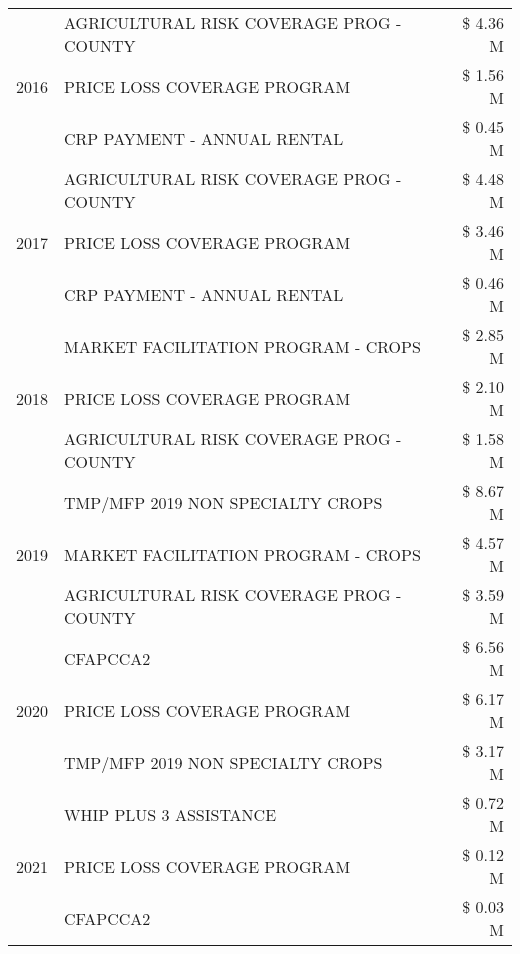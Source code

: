 \begin{tabular}{llr}
\cline{1-3}
\multirow[t]{3}{*}{2016} & AGRICULTURAL RISK COVERAGE PROG - COUNTY & \$ 4.36 M \\
 & PRICE LOSS COVERAGE PROGRAM & \$ 1.56 M \\
 & CRP PAYMENT - ANNUAL RENTAL & \$ 0.45 M \\
\cline{1-3}
\multirow[t]{3}{*}{2017} & AGRICULTURAL RISK COVERAGE PROG - COUNTY & \$ 4.48 M \\
 & PRICE LOSS COVERAGE PROGRAM & \$ 3.46 M \\
 & CRP PAYMENT - ANNUAL RENTAL & \$ 0.46 M \\
\cline{1-3}
\multirow[t]{3}{*}{2018} & MARKET FACILITATION PROGRAM - CROPS & \$ 2.85 M \\
 & PRICE LOSS COVERAGE PROGRAM & \$ 2.10 M \\
 & AGRICULTURAL RISK COVERAGE PROG - COUNTY & \$ 1.58 M \\
\cline{1-3}
\multirow[t]{3}{*}{2019} & TMP/MFP 2019 NON SPECIALTY CROPS & \$ 8.67 M \\
 & MARKET FACILITATION PROGRAM - CROPS & \$ 4.57 M \\
 & AGRICULTURAL RISK COVERAGE PROG - COUNTY & \$ 3.59 M \\
\cline{1-3}
\multirow[t]{3}{*}{2020} & CFAPCCA2 & \$ 6.56 M \\
 & PRICE LOSS COVERAGE PROGRAM & \$ 6.17 M \\
 & TMP/MFP 2019 NON SPECIALTY CROPS & \$ 3.17 M \\
\cline{1-3}
\multirow[t]{3}{*}{2021} & WHIP PLUS 3 ASSISTANCE & \$ 0.72 M \\
 & PRICE LOSS COVERAGE PROGRAM & \$ 0.12 M \\
 & CFAPCCA2 & \$ 0.03 M \\
\cline{1-3}
\bottomrule
\end{tabular}
